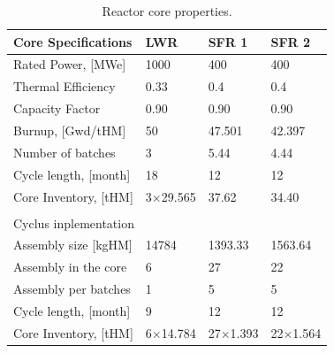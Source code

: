 \documentclass[12pt]{article}
\begin{document}
\begin{table}[h!]
    \centering
    \begin{tabularx}{350pt}{lXXX}
      \hline
      Core Specifications   &  LWR             &  SFR 1            &  SFR 2            \\
      \hline
      Rated Power, [MWe]    &  1000            &  400              &  400              \\
      Thermal Efficiency    &  0.33            &  0.4              &  0.4              \\
      Capacity Factor       &  0.90            &  0.90             &  0.90             \\
      Burnup, [Gwd/tHM]     &  50              &  47.501           &  42.397           \\
      Number of batches     &  3               &  5.44             &  4.44             \\
      Cycle length, [month] &  18              &  12               &  12               \\
      Core Inventory, [tHM] &  3$\times$29.565 &  37.62            &  34.40            \\
                                                                                       \\
      \multicolumn{4}{l}{Cyclus inplementation}                                        \\ 
      \hline
      \hline
      Assembly size [kgHM]  &  14784           &  1393.33          &  1563.64          \\
      Assembly in the core  &  6               &  27               &  22               \\
      Assembly per batches  &  1               &  5                &  5                \\
      Cycle length, [month] &  9               &  12               &  12               \\
      Core Inventory, [tHM] &  6$\times$14.784 &  27$\times$1.393  &  22$\times$1.564  \\
      \hline
    \end{tabularx}
    \caption{Reactor core properties.}
    \label{tab:reactor}
\end{table}
\end{document}

